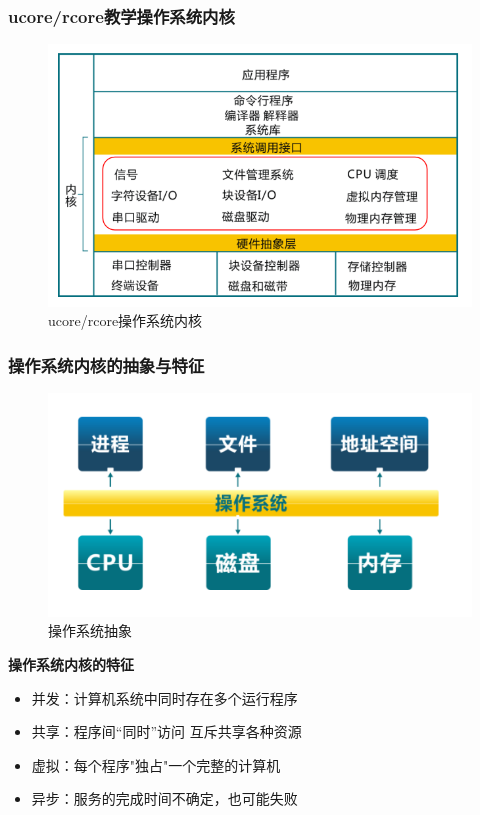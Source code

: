 \documentclass[UTF8]{ctexbeamer}
\begin{document}
\begin{frame}
	\frametitle{ucore/rcore教学操作系统内核}
	\begin{figure}
		\centering
		\includegraphics[width=0.8\linewidth]{ucore-arch}
		\caption{ucore/rcore操作系统内核}
	\end{figure}
\end{frame}



\begin{frame}
	\frametitle{操作系统内核的抽象与特征}
	\begin{figure}
	\centering
	\includegraphics[width=0.5\linewidth]{os-abstract}
	\caption{操作系统抽象}
\end{figure}
	\textbf{操作系统内核的特征}
	\begin{itemize}
		\item 并发：计算机系统中同时存在多个运行程序
		\item 共享：程序间“同时”访问 互斥共享各种资源
		\item 虚拟：每个程序"独占"一个完整的计算机
		\item 异步：服务的完成时间不确定，也可能失败
	\end{itemize}

\end{frame}
\end{document}
